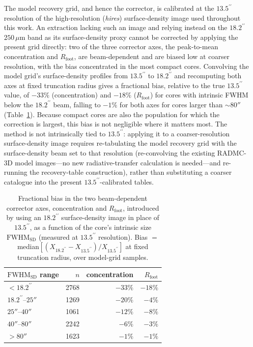\documentclass[11pt,a4paper]{article}
\begin{document}
The model recovery grid, and hence the corrector, is calibrated at the
$13.5^{\prime\prime}$ resolution of the high-resolution (\emph{hires}) surface-density
image used throughout this work. An extraction lacking such an image and
relying instead on the $18.2^{\prime\prime}$ $250\,\mu$m band as its surface-density
proxy cannot be corrected by applying the present grid directly: two of the
three corrector axes, the peak-to-mean concentration and $R_{\mathrm{foot}}$,
are beam-dependent and are biased low at coarser resolution, with the bias
concentrated in the most compact cores. Convolving the model grid's
surface-density profiles from $13.5^{\prime\prime}$ to $18.2^{\prime\prime}$ and recomputing both
axes at fixed truncation radius gives a fractional bias, relative to the true
$13.5^{\prime\prime}$ value, of $-33\%$ (concentration) and $-18\%$ ($R_{\mathrm{foot}}$)
for cores with intrinsic FWHM below the $18.2^{\prime\prime}$ beam, falling to
$-1\%$ for both axes for cores larger than $\sim\!80''$ (Table~\ref{tab:res}).
Because compact cores are also the population for which the correction is
largest, this bias is not negligible where it matters most. The method is not
intrinsically tied to $13.5^{\prime\prime}$: applying it to a coarser-resolution
surface-density image requires re-tabulating the model recovery grid with
the surface-density beam set to that resolution (re-convolving the existing
RADMC-3D model images---no new radiative-transfer calculation is needed---and
re-running the recovery-table construction), rather than substituting a
coarser catalogue into the present $13.5^{\prime\prime}$-calibrated tables.

\begin{table}
\caption{Fractional bias in the two beam-dependent corrector axes,
concentration and $R_{\mathrm{foot}}$, introduced by using an $18.2^{\prime\prime}$
surface-density image in place of $13.5^{\prime\prime}$, as a function of the core's
intrinsic size $\mathrm{FWHM}_{\mathrm{SD}}$ (measured at $13.5^{\prime\prime}$
resolution). Bias $=$ median$[(X_{18.2^{\prime\prime}}-X_{13.5^{\prime\prime}})/X_{13.5^{\prime\prime}}]$
at fixed truncation radius, over model-grid samples.}
\label{tab:res}
\centering
\begin{tabular}{lrrr}
\hline
$\mathrm{FWHM}_{\mathrm{SD}}$ range & $n$ & concentration & $R_{\mathrm{foot}}$ \\
\hline
$<18.2^{\prime\prime}$      & 2768 & $-33\%$ & $-18\%$ \\
$18.2^{\prime\prime}$--$25''$ & 1269 & $-20\%$ & $-4\%$ \\
$25''$--$40''$     & 1061 & $-12\%$ & $-8\%$ \\
$40''$--$80''$     & 2242 & $-6\%$  & $-3\%$ \\
$>80''$            & 1623 & $-1\%$  & $-1\%$ \\
\hline
\end{tabular}
\end{table}
\end{document}
